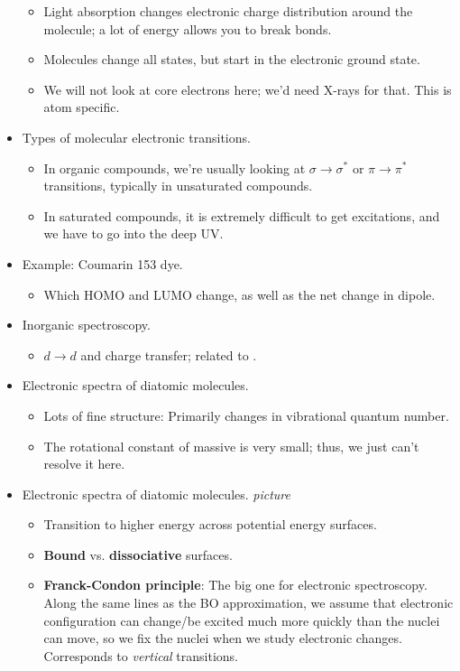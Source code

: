 \documentclass[../notes.tex]{subfiles}
\begin{document}
\begin{itemize}
\begin{itemize}
        \item Light absorption changes electronic charge distribution around the molecule; a lot of energy allows you to break bonds.
        \item Molecules change all states, but start in the electronic ground state.
        \item We will not look at core electrons here; we'd need X-rays for that. This is atom specific.
    \end{itemize}
    \item Types of molecular electronic transitions.
    \begin{itemize}
        \item In organic compounds, we're usually looking at $\sigma\to\sigma^*$ or $\pi\to\pi^*$ transitions, typically in unsaturated compounds.
        \item In saturated compounds, it is extremely difficult to get excitations, and we have to go into the deep UV.
    \end{itemize}
    \item Example: Coumarin 153 dye.
    \begin{itemize}
        \item Which HOMO and LUMO change, as well as the net change in dipole.
    \end{itemize}
    \item Inorganic spectroscopy.
    \begin{itemize}
        \item $d\to d$ and charge transfer; related to .
    \end{itemize}
    \item Electronic spectra of diatomic molecules.
    \begin{itemize}
        \item Lots of fine structure: Primarily changes in vibrational quantum number.
        \item The rotational constant of massive  is very small; thus, we just can't resolve it here.
    \end{itemize}
    \item Electronic spectra of diatomic molecules.
    \emph{picture}
    \begin{itemize}
        \item Transition to higher energy across potential energy surfaces.
        \item \textbf{Bound} vs. \textbf{dissociative} surfaces.
        \item \textbf{Franck-Condon principle}: The big one for electronic spectroscopy. Along the same lines as the BO approximation, we assume that electronic configuration can change/be excited much more quickly than the nuclei can move, so we fix the nuclei when we study electronic changes. Corresponds to \emph{vertical} transitions.

\end{itemize}
\end{itemize}
\end{document}
